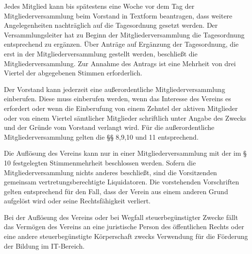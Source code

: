 \documentclass[parskip]{scrartcl}
\begin{document}
\begin{contract}

Jedes Mitglied kann bis spätestens eine Woche vor dem Tag der Mitgliederversammlung beim Vorstand in Textform beantragen, dass weitere Angelegenheiten nachträglich auf die Tagesordnung gesetzt werden. Der Versammlungsleiter hat zu Beginn der Mitgliederversammlung die Tagesordnung entsprechend zu ergänzen. Über Anträge auf Ergänzung der Tagesordnung, die erst in der Mitgliederversammlung gestellt werden, beschließt die Mitgliederversammlung. Zur Annahme des Antrags ist eine Mehrheit von drei Viertel der abgegebenen Stimmen erforderlich.


Der Vorstand kann jederzeit eine außerordentliche Mitgliederversammlung einberufen. Diese muss einberufen werden, wenn das Interesse des Vereins es erfordert oder wenn die Einberufung von einem Zehntel der aktiven Mitglieder oder von einem Viertel sämtlicher Mitglieder schriftlich unter Angabe des Zwecks und der Gründe vom Vorstand verlangt wird. Für die außerordentliche Mitgliederversammlung gelten die §§ 8,9,10 und 11 entsprechend.


Die Auflösung des Vereins kann nur in einer Mitgliederversammlung mit der im § 10 festgelegten Stimmenmehrheit beschlossen werden. Sofern die Mitgliederversammlung nichts anderes beschließt, sind die Vorsitzenden gemeinsam vertretungsberechtigte Liquidatoren. Die vorstehenden Vorschriften gelten entsprechend für den Fall, dass der Verein aus einem anderen Grund aufgelöst wird oder seine Rechtsfähigkeit verliert.

Bei der Auflösung des Vereins oder bei Wegfall steuerbegünstigter Zwecke fällt das Vermögen des Vereins an eine juristische Person des öffentlichen Rechts oder eine andere steuerbegünstigte Körperschaft zwecks Verwendung für die Förderung der Bildung im IT-Bereich.
\end{contract}
\end{document}
